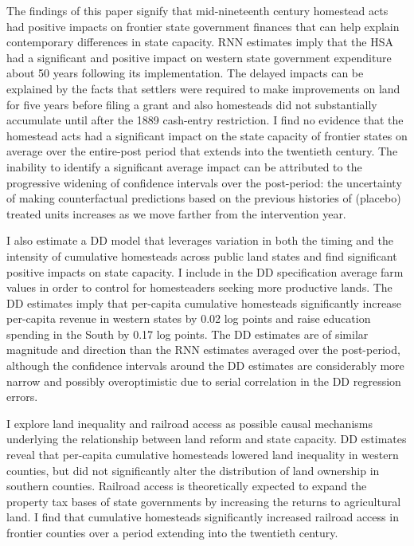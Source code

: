 \documentclass[12pt]{article}
\begin{document}
The findings of this paper signify that mid-nineteenth century homestead acts had positive impacts on frontier state government finances that can help explain contemporary differences in state capacity. RNN estimates imply that the HSA had a significant and positive impact on western state government expenditure about 50 years following its implementation. The delayed impacts can be explained by the facts that settlers were required to make improvements on land for five years before filing a grant and also homesteads did not substantially accumulate until after the 1889 cash-entry restriction. I find no evidence that the homestead acts had a significant impact on the state capacity of frontier states on average over the entire-post period that extends into the twentieth century. The inability to identify a significant average impact can be attributed to the progressive widening of confidence intervals over the post-period: the uncertainty of making counterfactual predictions based on the previous histories of (placebo) treated units increases as we move farther from the intervention year. 

I also estimate a DD model that leverages variation in both the timing and the intensity of cumulative homesteads across public land states and find significant positive impacts on state capacity. I include in the DD specification average farm values in order to control for homesteaders seeking more productive lands. The DD estimates imply that per-capita cumulative homesteads significantly increase per-capita revenue in western states by 0.02 log points and raise education spending in the South by 0.17 log points. The DD estimates are of similar magnitude and direction than the RNN estimates averaged over the post-period, although the confidence intervals around the DD estimates are considerably more narrow and possibly overoptimistic due to serial correlation in the DD regression errors.

I explore land inequality and railroad access as possible causal mechanisms underlying the relationship between land reform and state capacity. DD estimates reveal that per-capita cumulative homesteads lowered land inequality in western counties, but did not significantly alter the distribution of land ownership in southern counties. Railroad access is theoretically expected to expand the property tax bases of state governments by increasing the returns to agricultural land. I find that cumulative homesteads significantly increased railroad access in frontier counties over a period extending into the twentieth century. 
\end{document}
